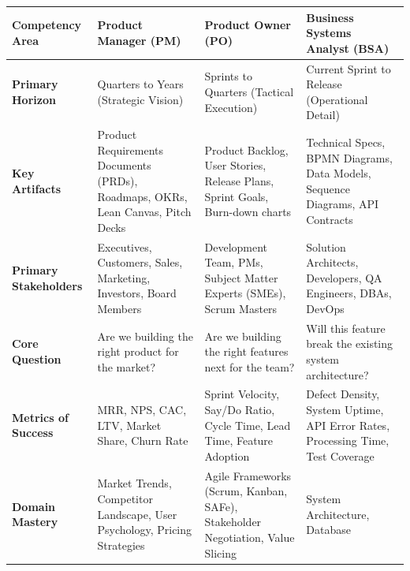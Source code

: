 \begin{longtable}[]{@{}
  >{\raggedright\arraybackslash}p{}
  >{\raggedright\arraybackslash}p{}
  >{\raggedright\arraybackslash}p{}
  >{\raggedright\arraybackslash}p{}@{}}
\toprule\noalign{}
\begin{minipage}[b]{\linewidth}\raggedright
Competency Area
\end{minipage} & \begin{minipage}[b]{\linewidth}\raggedright
Product Manager (PM)
\end{minipage} & \begin{minipage}[b]{\linewidth}\raggedright
Product Owner (PO)
\end{minipage} & \begin{minipage}[b]{\linewidth}\raggedright
Business Systems Analyst (BSA)
\end{minipage} \\
\midrule\noalign{}
\endhead
\bottomrule\noalign{}
\endlastfoot
\textbf{Primary Horizon} & Quarters to Years (Strategic Vision) &
Sprints to Quarters (Tactical Execution) & Current Sprint to Release
(Operational Detail) \\
\textbf{Key Artifacts} & Product Requirements Documents (PRDs),
Roadmaps, OKRs, Lean Canvas, Pitch Decks & Product Backlog, User
Stories, Release Plans, Sprint Goals, Burn-down charts & Technical
Specs, BPMN Diagrams, Data Models, Sequence Diagrams, API Contracts \\
\textbf{Primary Stakeholders} & Executives, Customers, Sales, Marketing,
Investors, Board Members & Development Team, PMs, Subject Matter Experts
(SMEs), Scrum Masters & Solution Architects, Developers, QA Engineers,
DBAs, DevOps \\
\textbf{Core Question} & Are we building the right product for the
market? & Are we building the right features next for the team? & Will
this feature break the existing system architecture? \\
\textbf{Metrics of Success} & MRR, NPS, CAC, LTV, Market Share, Churn
Rate & Sprint Velocity, Say/Do Ratio, Cycle Time, Lead Time, Feature
Adoption & Defect Density, System Uptime, API Error Rates, Processing
Time, Test Coverage \\
\textbf{Domain Mastery} & Market Trends, Competitor Landscape, User
Psychology, Pricing Strategies & Agile Frameworks (Scrum, Kanban, SAFe),
Stakeholder Negotiation, Value Slicing & System Architecture, Database

\end{longtable}
